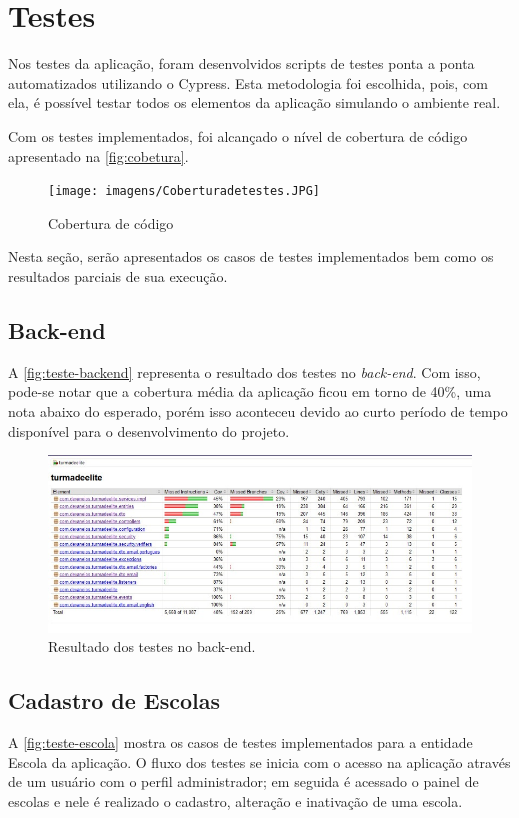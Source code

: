 \section{Testes}
Nos testes da aplicação, foram desenvolvidos scripts de testes ponta a ponta automatizados utilizando o Cypress. Esta metodologia foi escolhida, pois, com ela, é possível testar todos os elementos da aplicação simulando o ambiente real. 

Com os testes implementados, foi alcançado o nível de cobertura de código apresentado na \autoref{fig:cobetura}.

\begin{figure}[htb]
    \centering
	\texttt{[image: imagens/Coberturadetestes.JPG]}
	\caption{\label{fig:cobetura} Cobertura de código}
\end{figure}

Nesta seção, serão apresentados os casos de testes implementados bem como os resultados parciais de sua execução.
\subsection{Back-end}
A \autoref{fig:teste-backend} representa o resultado dos testes no \textit{\gls{back-end}}. Com isso, pode-se notar que a cobertura média da aplicação ficou em torno de 40\%, uma nota abaixo do esperado, porém isso aconteceu devido ao curto período de tempo disponível para o desenvolvimento do projeto.
\begin{figure}[htb]
    \centering
	\includegraphics[width=16cm]{imagens/TesteBackend.jpg}
	\caption{\label{fig:teste-backend} Resultado dos testes no back-end.}
\end{figure}

\subsection{Cadastro de Escolas}
A \autoref{fig:teste-escola} mostra os casos de testes implementados para a entidade Escola da aplicação. O fluxo dos testes se inicia com o acesso na aplicação através de um usuário com o perfil administrador; em seguida é acessado o painel de escolas e nele é realizado o cadastro, alteração e inativação de uma escola.


